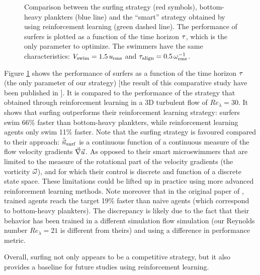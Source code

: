\begin{figure}%
    \centering
    
    \caption[Comparison of the surfing strategy to the result of a reinforcement learning algorithm in turbulence.]{
    	Comparison between the surfing strategy (red symbols), bottom-heavy plankters (blue line) and the ``smart'' strategy obtained by \citet{Alageshan2020} using reinforcement learning (green dashed line).
   		The performance of surfers is plotted as a function of the time horizon $\tau$, which is the only parameter to optimize. The swimmers have the same characteristics: $V_{\mathrm{swim}} = 1.5 \,u_{\mathrm{rms}}$ and $\tau_{\mathrm{align}} = 0.5\, \omega_{\mathrm{rms}}^{-1}$.
    }
    \label{fig:comparison_reinforcement_learning}
\end{figure}
Figure \ref{fig:comparison_reinforcement_learning} shows the performance of surfers as a function of the time horizon $\tau$ (the only parameter of our strategy)
[the result of this comparative study have been published in \citet{monthiller2022surfing}].
It is compared to the performance of the strategy that \citet{Alageshan2020} obtained through reinforcement learning in a 3D turbulent flow of $\mathit{Re}_{\lambda} = 30$.
It shows that surfing outperforms their reinforcement learning strategy: surfers swim 66\% faster than bottom-heavy plankters, while reinforcement learning agents only swim 11\% faster. Note that the surfing strategy is favoured compared to their approach: $\hat{\vec{n}}_{\mathrm{surf}}$ is a continuous function of a continuous measure of the flow velocity gradients $\vec{\nabla} \vec{u}$.
As opposed to their smart microswimmers that are limited to the measure of the rotational part of the velocity gradients (the vorticity $\vec{\omega}$), and for which their control is discrete and function of a discrete state space. 
These limitations could be lifted up in practice using more advanced reinforcement learning methods.
Note moreover that in the original paper of \citet{Alageshan2020}, trained agents reach the target 19\% faster than naive agents (which correspond to bottom-heavy plankters).
The discrepancy is likely due to the fact that their behavior has been trained in a different simulation flow simulation (our Reynolds number $\mathit{Re}_{\lambda} = 21$ is different from theirs) and using a difference in performance metric.

Overall, surfing not only appears to be a competitive strategy, but it also provides a baseline for future studies using reinforcement learning.

